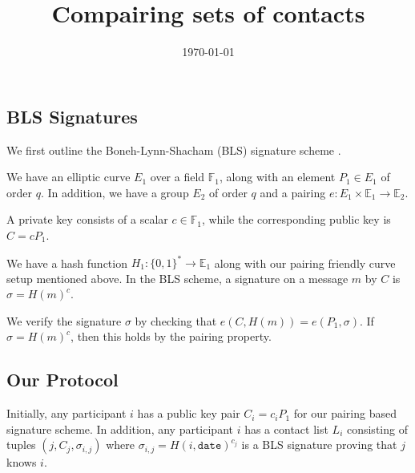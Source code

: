 \documentclass[twoside,letterpaper]{sig-alternate}
\title{Compairing sets of contacts}
\date{\today}
\begin{document}
\maketitle




\def\E{\mathbb{E}}
\def\F{\mathbb{F}}
\def\Z{\mathbb{Z}}




\subsection{BLS Signatures}

We first outline the Boneh-Lynn-Shacham (BLS) signature scheme \cite{BLS-SigWeilPairing}.

We have an elliptic curve $E_1$ over a field $\F_1$,
 along with an element $P_1 \in E_1$ of order $q$.
In addition, we have a group $E_2$ of order $q$ and
 a pairing $e : E_1 \times \E_1 \to \E_2$.

A private key consists of a scalar $c \in \F_1$, while
the corresponding public key is $C = c P_1$.

We have a hash function $H_1 : \{0,1\}^* \to \E_1$ along with
 our pairing friendly curve setup mentioned above.
In the BLS scheme,
a signature on a message $m$ by $C$ is $\sigma = H(m)^c$.

We verify the signature $\sigma$ by checking that
  $e(C,H(m)) = e(P_1,\sigma)$.
If $\sigma = H(m)^c$, then this holds by the pairing property.

\subsection{Our Protocol}

Initially, any participant $i$ has a public key pair $C_i = c_i P_1$
 for our pairing based signature scheme.  
In addition, any participant $i$ has a contact list $L_i$ consisting
of tuples $(j,C_j,\sigma_{i,j})$ where
 $\sigma_{i,j} = H(i,\texttt{date})^{c_j}$
 is a BLS signature proving that $j$ knows $i$.
\end{document}
